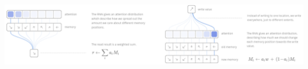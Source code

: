 \begin{minipage}{\linewidth}
        \centering
        \hspace*{-2cm}    
        \includegraphics[width=18cm, height=5cm]{images/attention.png}
\end{minipage} \\ \\



